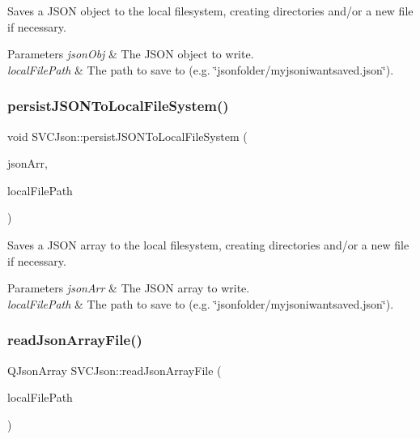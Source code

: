 Saves a J\+S\+ON object to the local filesystem, creating directories and/or a new file if necessary. 


\begin{DoxyParams}{Parameters}
{\em json\+Obj} & The J\+S\+ON object to write. \\
\hline
{\em local\+File\+Path} & The path to save to (e.\+g. \char`\"{}jsonfolder/myjsoniwantsaved.\+json\char`\"{}). \\
\hline
\end{DoxyParams}
\mbox{\label{class_s_v_c_json_a957845d6aad8c6acd176de1b9108bed5}} 
\subsubsection{\texorpdfstring{persistJSONToLocalFileSystem()}{persistJSONToLocalFileSystem()}\hspace{0.1cm}{\footnotesize\ttfamily [2/2]}}
{\footnotesize\ttfamily void S\+V\+C\+Json\+::persist\+J\+S\+O\+N\+To\+Local\+File\+System (\begin{DoxyParamCaption}\item[{Q\+Json\+Array}]{json\+Arr,  }\item[{Q\+String}]{local\+File\+Path }\end{DoxyParamCaption})}



Saves a J\+S\+ON array to the local filesystem, creating directories and/or a new file if necessary. 


\begin{DoxyParams}{Parameters}
{\em json\+Arr} & The J\+S\+ON array to write. \\
\hline
{\em local\+File\+Path} & The path to save to (e.\+g. \char`\"{}jsonfolder/myjsoniwantsaved.\+json\char`\"{}). \\
\hline
\end{DoxyParams}
\mbox{\label{class_s_v_c_json_a0f80c2f8372fdfe4158df6f49ccbe1ac}} 
\subsubsection{\texorpdfstring{readJsonArrayFile()}{readJsonArrayFile()}}
{\footnotesize\ttfamily Q\+Json\+Array S\+V\+C\+Json\+::read\+Json\+Array\+File (\begin{DoxyParamCaption}\item[{Q\+String}]{local\+File\+Path }\end{DoxyParamCaption})}



